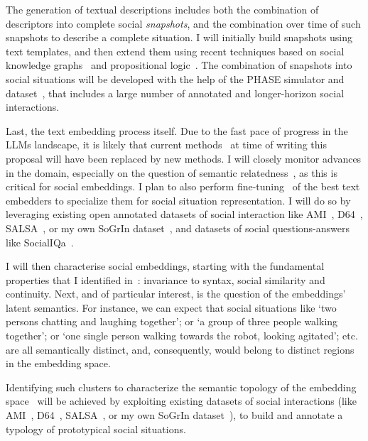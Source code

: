 
The generation of textual descriptions includes both the combination of
descriptors into complete social \emph{snapshots}, and the combination over time
of such snapshots to describe a complete situation. I will initially build
snapshots using text templates, and then extend them using recent techniques
based on social knowledge graphs~\cite{sap2019atomic} and propositional
logic~\cite{tsoi2022sean}. The combination of snapshots into social situations
will be developed with the help of the PHASE simulator and
dataset~\cite{netanyahu2021phase}, that includes a large number of annotated and
longer-horizon social interactions.

Last, the text embedding process itself. Due to the fast pace of progress in the
LLMs landscape, it is likely that current
methods~\cite{reimers2019sentencebert,muennighoff2022sgpt} at time of writing
this proposal will have been replaced by new methods. I will closely monitor
advances in the domain, especially on the question of semantic
relatedness~\cite{thakur2021beir}, as this is critical for social
embeddings. I plan to also perform fine-tuning~\cite{hadsell2006dimensionality}
of the best text embedders to specialize them for social situation
representation. I will do so by leveraging existing open annotated datasets of
social interaction like AMI~\cite{carletta2007ami}, D64~\cite{oertel2013d64},
SALSA~\cite{alameda2015salsa}, or my own SoGrIn dataset~\cite{webb2023sogrin},
and datasets of social questions-answers like SocialIQa~\cite{sap2019social}.

I will then characterise social embeddings, starting with the fundamental
properties that I identified in~\cite{lemaignan2024social}: invariance to
syntax, social similarity and continuity. Next, and of particular interest, is
the question of the embeddings' latent semantics. For instance, we can expect
that social situations like `two persons chatting and laughing together'; or `a
group of three people walking together'; or `one single person walking towards
the robot, looking agitated'; etc.  are all semantically distinct, and,
consequently, would belong to distinct regions in the embedding space.

Identifying such clusters to characterize the semantic topology of the embedding
space~\cite{sun2023topological} will be achieved by exploiting existing datasets
of social interactions (like AMI~\cite{carletta2007ami},
D64~\cite{oertel2013d64}, SALSA~\cite{alameda2015salsa}, or my own SoGrIn
dataset~\cite{webb2023sogrin}), to build and annotate a typology of prototypical
social situations.

